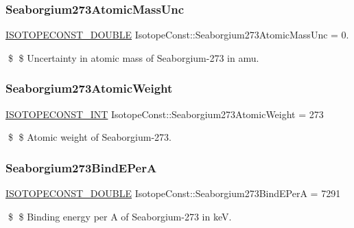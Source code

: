 \subsubsection{\texorpdfstring{Seaborgium273\+Atomic\+Mass\+Unc}{Seaborgium273AtomicMassUnc}}
{\footnotesize\ttfamily \mbox{\hyperlink{group___isotope_const-_macros_ga8f45a7272ce02c0b4c65c44636ed719a}{I\+S\+O\+T\+O\+P\+E\+C\+O\+N\+S\+T\+\_\+\+D\+O\+U\+B\+LE}} Isotope\+Const\+::\+Seaborgium273\+Atomic\+Mass\+Unc = 0.}

\$ \$ Uncertainty in atomic mass of Seaborgium-\/273 in amu. \mbox{\label{group___isotope_const-_seaborgium-_sg273_ga7e555146916f83e3efe3691cd4336d6e}} 
\subsubsection{\texorpdfstring{Seaborgium273\+Atomic\+Weight}{Seaborgium273AtomicWeight}}
{\footnotesize\ttfamily \mbox{\hyperlink{group___isotope_const-_macros_ga5f18360b3e99483a35c32d789e62621c}{I\+S\+O\+T\+O\+P\+E\+C\+O\+N\+S\+T\+\_\+\+I\+NT}} Isotope\+Const\+::\+Seaborgium273\+Atomic\+Weight = 273}

\$ \$ Atomic weight of Seaborgium-\/273. \mbox{\label{group___isotope_const-_seaborgium-_sg273_gaef8e814d22d3d362ad06f78a723065e9}} 
\subsubsection{\texorpdfstring{Seaborgium273\+Bind\+E\+PerA}{Seaborgium273BindEPerA}}
{\footnotesize\ttfamily \mbox{\hyperlink{group___isotope_const-_macros_ga8f45a7272ce02c0b4c65c44636ed719a}{I\+S\+O\+T\+O\+P\+E\+C\+O\+N\+S\+T\+\_\+\+D\+O\+U\+B\+LE}} Isotope\+Const\+::\+Seaborgium273\+Bind\+E\+PerA = 7291}

\$ \$ Binding energy per A of Seaborgium-\/273 in keV. \mbox{\label{group___isotope_const-_seaborgium-_sg273_gae168b849debbdcb16a09ae7d3a9d85ff}} 
